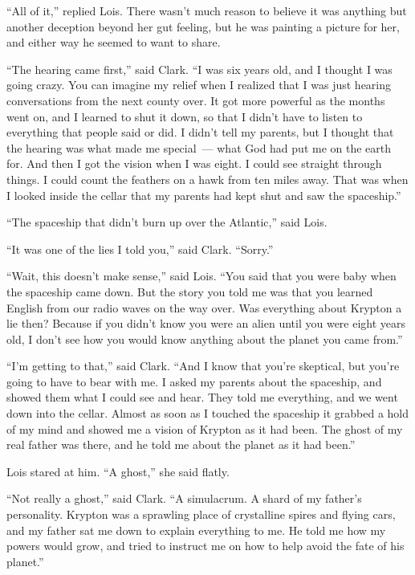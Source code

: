 \documentclass[ebook,12pt]{memoir}
\begin{document}
``All of it,'' replied Lois. There wasn't much reason to believe it was
anything but another deception beyond her gut feeling, but he was
painting a picture for her, and either way he seemed to want to share.

``The hearing came first,'' said Clark. ``I was six years old, and I
thought I was going crazy. You can imagine my relief when I realized
that I was just hearing conversations from the next county over. It got
more powerful as the months went on, and I learned to shut it down, so
that I didn't have to listen to everything that people said or did. I
didn't tell my parents, but I thought that the hearing was what made me
special~--- what God had put me on the earth for. And then I got the
vision when I was eight. I could see straight through things. I could
count the feathers on a hawk from ten miles away. That was when I looked
inside the cellar that my parents had kept shut and saw the spaceship.''

``The spaceship that didn't burn up over the Atlantic,'' said Lois.

``It was one of the lies I told you,'' said Clark. ``Sorry.''

``Wait, this doesn't make sense,'' said Lois. ``You said that you were
baby when the spaceship came down. But the story you told me was that
you learned English from our radio waves on the way over. Was everything
about Krypton a lie then? Because if you didn't know you were an alien
until you were eight years old, I don't see how you would know anything
about the planet you came from.''

``I'm getting to that,'' said Clark. ``And I know that you're skeptical,
but you're going to have to bear with me. I asked my parents about the
spaceship, and showed them what I could see and hear. They told me
everything, and we went down into the cellar. Almost as soon as I
touched the spaceship it grabbed a hold of my mind and showed me a
vision of Krypton as it had been. The ghost of my real father was there,
and he told me about the planet as it had been.''

Lois stared at him. ``A ghost,'' she said flatly.

``Not really a ghost,'' said Clark. ``A simulacrum. A shard of my
father's personality. Krypton was a sprawling place of crystalline
spires and flying cars, and my father sat me down to explain everything
to me. He told me how my powers would grow, and tried to instruct me on
how to help avoid the fate of his planet.''
\end{document}
